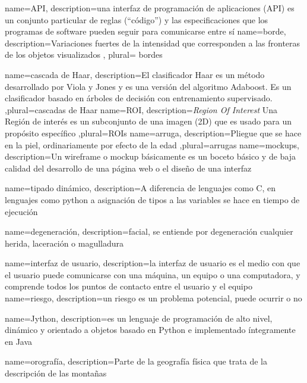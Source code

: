 

{
	name=API,
	description={una interfaz de programación de aplicaciones (API) es un conjunto particular de reglas (``código'') y las especificaciones que los programas de software pueden seguir para comunicarse entre sí} 
}
{
	name=borde,
	description={Variaciones fuertes de la intensidad que	corresponden a las fronteras de los objetos visualizados} , plural= bordes
}


{
	name=cascada de Haar,
	description={El clasificador Haar es un método desarrollado por Viola y Jones y es una versión del algoritmo Adaboost. Es un clasificador basado en árboles de decisión con entrenamiento supervisado.} ,plural=cascadas de Haar
}
{
	name=ROI,
	description={\textit{Region Of Interest} Una Región de interés es un subconjunto de una imagen (\gls{2D}) que es usado para un propósito específico} ,plural=ROIs
}
{
	name=arruga,
	description={Pliegue que se hace en la piel, ordinariamente por efecto de la edad} ,plural=arrugas
}
{
	name=mockups,
	description={Un wireframe o mockup básicamente es un boceto básico y de baja calidad del desarrollo de una página web o el diseño de una interfaz} 
}

{
	name=tipado dinámico,
	description={A diferencia de lenguajes como C, en lenguajes como \gls{python} a asignación de tipos a las variables se hace en tiempo de ejecución} 
}



{
	name=degeneración,
	description={facial, se entiende por degeneración cualquier herida, laceración o magulladura} 
}


 
{
	name=interfaz de usuario,
	description={la interfaz de usuario es el medio con que el usuario puede comunicarse con una máquina, un equipo o una computadora, y comprende todos los puntos de contacto entre el usuario y el equipo} 
}
{
	name=riesgo,
	description={un riesgo es un problema potencial, puede ocurrir o no} 
}

{
	name=Jython,
	description={es un lenguaje de programación de alto nivel, dinámico y orientado a objetos basado en Python e implementado íntegramente en Java} 
}


 
{
	name=orografía,
	description={Parte de la geografía física que trata de la descripción de las montañas} 
}


